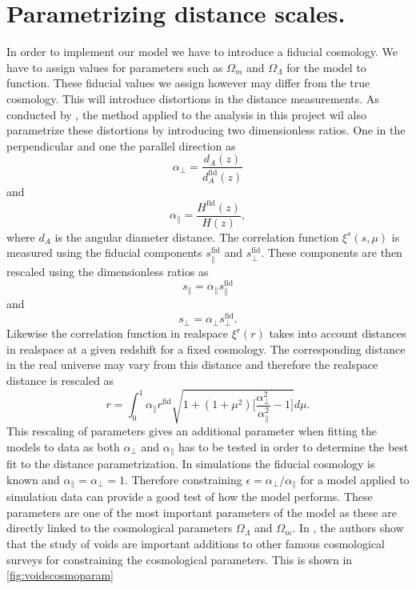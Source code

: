 \section{Parametrizing distance scales.}\label{sec:rescale_r}
In order to implement our model we have to introduce a fiducial cosmology. We have to assign values for parameters such as $\Omega_m$ and $\Omega_\Lambda$ for the model to function. These fiducial values we assign however may differ from the true cosmology. This will introduce distortions in the distance measurements. As conducted by \cite{BeyondBAO}, the method applied to the analysis in this project wil also parametrize these distortions by introducing two dimensionless ratios. One in the perpendicular and one the parallel direction as
\begin{equation}\label{eq:alpha_perp}
    \alpha_\perp=\frac{d_A(z)}{d_A^{\mathrm{fid}}(z)}
\end{equation} 
and
\begin{equation}\label{eq:alpha_par}
    \alpha_\parallel=\frac{H^{\mathrm{fid}}(z)}{H(z)},
\end{equation}
where $d_A$ is the angular diameter distance. The correlation function $\xi^s(s,\mu)$ is measured using the fiducial
components $s_\parallel^\mathrm{fid}$ and $s_\perp^\mathrm{fid}$. These components are then rescaled using the dimensionless ratios as
\begin{equation}
    s_\parallel=\alpha_\parallel s_\parallel^\mathrm{fid}
\end{equation}
and 
\begin{equation}
    s_\perp = \alpha_\perp s_\perp^\mathrm{fid}.
\end{equation}
Likewise the correlation function in realspace $\xi^r(r)$ takes into account distances in realspace at a given redshift for a fixed cosmology. The corresponding distance in the real universe may vary from this distance and therefore the realspace distance is rescaled as
\begin{equation}\label{eq:r_scaling}
    r=\int_0^1\alpha_\parallel r^{\mathrm{fid}}\sqrt{1+(1+\mu^2)\Big[\frac{\alpha_\perp^2}{\alpha_\parallel^2}-1\Big]}d\mu.
\end{equation}
This rescaling of parameters gives an additional parameter when fitting the models to data as both $\alpha_\perp$ and $\alpha_\parallel$ has to be tested in order to determine the best fit to the distance parametrization. In simulations the fiducial cosmology is known and $\alpha_\parallel=\alpha_\perp=1$. Therefore constraining $\epsilon=\alpha_\perp/\alpha_\parallel$ for a model applied to simulation data can provide a good test of how the model performs. These parameters are one of the most important parameters of the model as these are directly linked to the cosmological parameters $\Omega_\Lambda$ and $\Omega_m$. In \cite{Nadathur_2020}, the authors show that the study of voids are important additions to other famous cosmological surveys for constraining the cosmological parameters. This is shown in \ref{fig:voidscosmoparam}
